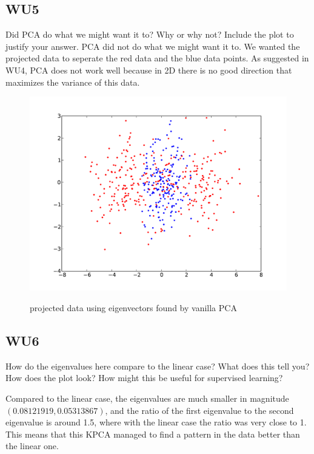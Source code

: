 \documentclass[a4paper,11pt]{article}
\begin{document}
\subsection{WU5}
\textsf{Did PCA do what we might want it to? Why or why not? Include
the plot to justify your answer.}\vspace{0.1in}
PCA did not do what we might want it to. We wanted the projected data to seperate the
red data and the blue data points. As suggested in WU4, PCA does not
work well because in 2D there is no good direction that maximizes the
variance of this data.
\begin{figure}[!ht]
  \begin{center}
  \caption{projected data using eigenvectors found by vanilla PCA}
  \includegraphics[width=4.5in]{WU5.pdf}
  \label{figures:wu5}
  \end{center}
\end{figure}

\subsection{WU6}
\textsf{How do the eigenvalues here compare to the linear case? What
does this tell you? How does the plot look? How might this be useful
for supervised learning?}\vspace{0.1in}

Compared to the linear case, the eigenvalues are much smaller in
magnitude $(0.08121919,  0.05313867)$, and the ratio of the first
eigenvalue to the second eigenvalue is around 1.5, where with the
linear case the ratio was very close to 1. This means that this KPCA
managed to find a pattern in the data better than the linear one.
\end{document}
